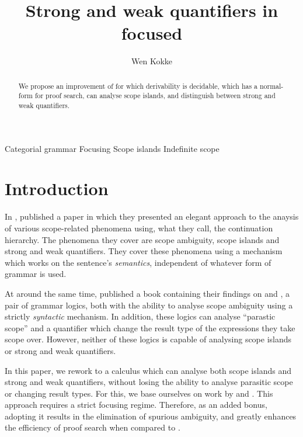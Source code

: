 \documentclass[10pt,a4paper]{llncs}
\begin{document}
\mainmatter%
\title{Strong and weak quantifiers in focused \NLCL}
\author{Wen Kokke}
\maketitle

\begin{abstract}
  We propose an improvement of  {\NLCL} for which
  derivability is decidable, which has a normal-form for proof search,
  can analyse scope islands, and distinguish between strong and weak
  quantifiers.
\end{abstract}
\begin{keywords}
  Categorial grammar
  {\textperiodcentered}
  Focusing
  {\textperiodcentered}
  Scope islands
  {\textperiodcentered}
  Indefinite scope
\end{keywords}

\section{Introduction}\label{sec:introduction}

In \citeyear{kiselyov2014}, \citet{kiselyov2014} published a
paper in which they presented an elegant approach to the anaysis of
various scope-related phenomena using, what they call, the
continuation hierarchy.
The phenomena they cover are scope ambiguity, scope islands and strong
and weak quantifiers.
They cover these phenomena using a mechanism which works on the
sentence's \emph{semantics}, independent of whatever form of grammar
is used.

At around the same time, \citet{barker2015} published a book
containing their findings on {\NLLAM} and {\NLCL}, a pair of grammar
logics, both with the ability to analyse scope ambiguity using a
strictly \emph{syntactic} mechanism.
In addition, these logics can analyse ``parastic scope''
\citep{barker2007,barker2015} and a quantifier which change the
result type of the expressions they take scope over.
However, neither of these logics is capable of analysing scope islands
or strong and weak quantifiers.

In this paper, we rework {\NLCL} to a calculus which can analyse both
scope islands and strong and weak quantifiers, without losing
the ability to analyse parasitic scope or changing result types.
For this, we base ourselves on work by \citet{moortgat1996} and
\citet{moortgat2012}. This approach requires a strict focusing
regime. Therefore, as an added bonus, adopting it results in the
elimination of spurious ambiguity, and greatly enhances the efficiency
of proof search when compared to  {\NLCL}.
\end{document}
